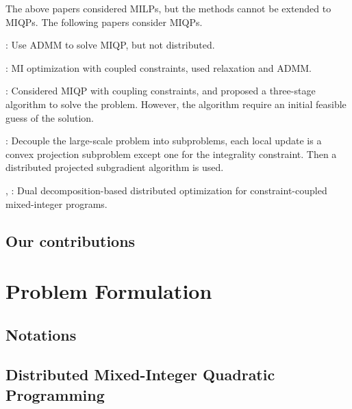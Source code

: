 \documentclass[twocolumn,amsthm]{autart}%
\theoremstyle{definition}
\theoremstyle{plain}
\begin{document}
The above papers considered MILPs, but the methods cannot be extended to MIQPs. The following papers consider MIQPs.

\cite{takapoui2020simple}: Use ADMM to solve MIQP, but not distributed.

\cite{liu2022distributed}: MI optimization with coupled constraints, used relaxation and ADMM.

\cite{liu2021distributed}: Considered MIQP with coupling constraints, and proposed a three-stage algorithm to solve the problem. However, the algorithm require an initial feasible guess of the solution.

\cite{sun2018distributed}: Decouple the large-scale problem into subproblems, each local update is a convex projection subproblem except one for the integrality constraint. Then a distributed projected subgradient algorithm is used.

\cite{yfantis2023hierarchical}, \cite{klostermeier2024numerical}: Dual decomposition-based distributed optimization for constraint-coupled mixed-integer programs.


\subsection{Our contributions}

\section{Problem Formulation}

\subsection{Notations}


\subsection{Distributed Mixed-Integer Quadratic Programming}
\end{document}
